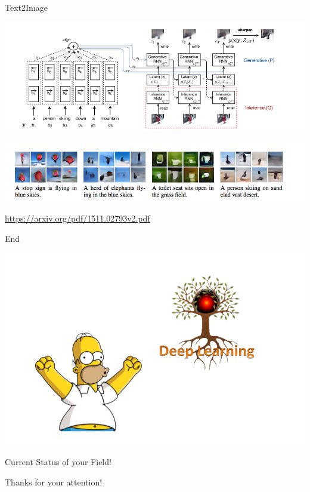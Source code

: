 \documentclass{beamer}
\begin{document}
\begin{frame}{Text2Image}
		\begin{center}
			\includegraphics[scale=0.35]{img/t2i}
			
			\includegraphics[scale=0.4]{img/t2ie.png}			
		\end{center}
	\href{https://arxiv.org/pdf/1511.02793v2.pdf}{https://arxiv.org/pdf/1511.02793v2.pdf}
\end{frame}

\begin{frame}{End} 
	\begin{center}				
		\includegraphics[scale=0.35]{img/csf}
		
		{\huge Current Status of your Field!}
		
		Thanks for your attention!
	\end{center}
\end{frame}
\end{document}
